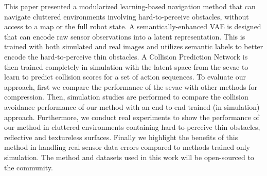 This paper presented a modularized learning-based navigation method that can navigate cluttered environments involving hard-to-perceive obstacles, without access to a map or the full robot state. A semantically-enhanced VAE is designed that can encode raw sensor observations into a latent representation. This is trained with both simulated and real images and utilizes semantic labels to better encode the hard-to-perceive thin obstacles. A Collision Prediction Network is then trained completely in simulation with the latent space from the \ac{sevae} to learn to predict collision scores for a set of action sequences. To evaluate our approach, first we compare the performance of the \ac{sevae} with other methods for compression. Then, simulation studies are performed to compare the collision avoidance performance of our method with an end-to-end trained (in simulation) approach. Furthermore, we conduct real experiments to show the performance of our method in cluttered environments containing hard-to-perceive thin obstacles, reflective and textureless surfaces. Finally we highlight the benefits of this method in handling real sensor data errors compared to methods trained only simulation. The method and datasets used in this work will be open-sourced to the community.